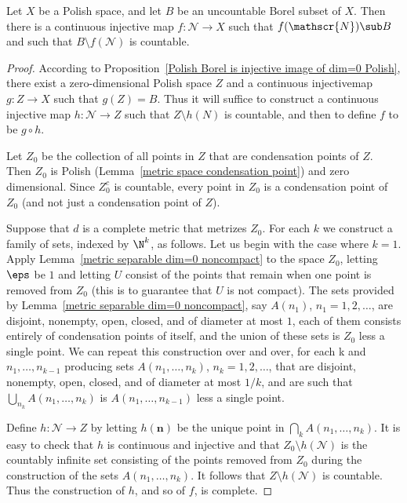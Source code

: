 \begin{proposition}\label{Polish uncountable Borel is injective image of N^N}
Let $X$ be a Polish space, and let $B$ be an uncountable Borel subset of $X$. Then there is a continuous injective map $f:\mathscr{N}\to X$ such that $f(\mathscr{N})\sub B$ and such that $B\setminus f(\mathscr{N})$ is countable.
\end{proposition}
\begin{proof}
According to Proposition~\ref{Polish Borel is injective image of dim=0 Polish}, there exist a zero-dimensional Polish space $Z$ and a continuous injectivemap $g:Z\to X$ such that $g(Z)=B$. Thus it will suffice to construct a continuous injective map $h:\mathscr{N}\to Z$ such that $Z\setminus h(N)$ is countable, and then to define $f$ to be $g\circ h$.\par
Let $Z_0$ be the collection of all points in $Z$ that are condensation points of $Z$. Then $Z_0$ is Polish (Lemma~\ref{metric space condensation point}) and zero dimensional. Since $Z_0^c$ is countable, every point in $Z_0$ is a condensation point of $Z_0$ (and not just a condensation point of $Z$).\par
Suppose that $d$ is a complete metric that metrizes $Z_0$. For each $k$ we construct a family of sets, indexed by $\N^k$, as follows. Let us begin with the case where $k=1$. Apply Lemma~\ref{metric separable dim=0 noncompact} to the space $Z_0$, letting $\eps$ be $1$ and letting $U$ consist of the points that remain when one point is removed from $Z_0$ (this is to guarantee that $U$ is not compact). The sets provided by Lemma~\ref{metric separable dim=0 noncompact}, say $A(n_1)$, $n_1=1,2,\dots$, are disjoint, nonempty, open, closed, and of diameter at most $1$, each of them consists entirely of condensation points of itself, and the union of these sets is $Z_0$ less a single point. We can repeat this construction over and over, for each k and $n_1,\dots,n_{k-1}$ producing sets $A(n_1,\dots,n_k)$, $n_k=1,2,\dots$, that are disjoint, nonempty, open, closed, and of diameter at most $1/k$, and are such that $\bigcup_{n_k}A(n_1,\dots,n_k)$ is $A(n_1,\dots,n_{k-1})$ less a single point.\par
Define $h:\mathscr{N}\to Z$ by letting $h(\mathbf{n})$ be the unique point in $\bigcap_kA(n_1,\dots,n_k)$. It is easy to check that $h$ is continuous and injective and that $Z_0\setminus h(\mathscr{N})$ is the countably infinite set consisting of the points removed from $Z_0$ during the construction of the sets $A(n_1,\dots,n_k)$. It follows that $Z\setminus h(\mathscr{N})$ is countable. Thus the construction of $h$, and so of $f$, is complete.
\end{proof}
